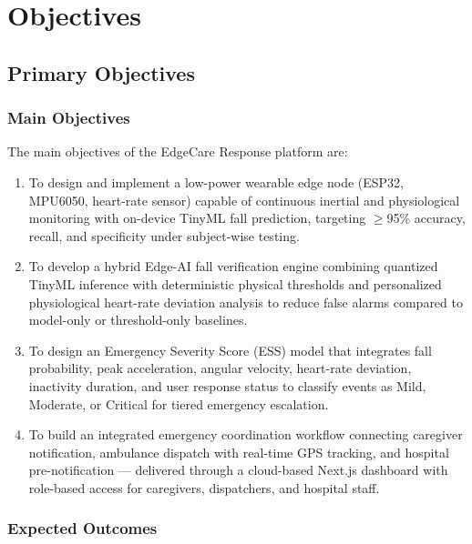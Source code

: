 \chapter{Objectives}

\section[Primary Objectives]{\textbf{Primary Objectives}}

\subsection{Main Objectives}

The main objectives of the EdgeCare Response platform are:
\begin{enumerate}
\item To design and implement a low-power wearable edge node (ESP32, MPU6050, heart-rate sensor) capable of continuous inertial and physiological monitoring with on-device TinyML fall prediction, targeting $\geq$95\% accuracy, recall, and specificity under subject-wise testing.
\item To develop a hybrid Edge-AI fall verification engine combining quantized TinyML inference with deterministic physical thresholds and personalized physiological heart-rate deviation analysis to reduce false alarms compared to model-only or threshold-only baselines.
\item To design an Emergency Severity Score (ESS) model that integrates fall probability, peak acceleration, angular velocity, heart-rate deviation, inactivity duration, and user response status to classify events as Mild, Moderate, or Critical for tiered emergency escalation.
\item To build an integrated emergency coordination workflow connecting caregiver notification, ambulance dispatch with real-time GPS tracking, and hospital pre-notification — delivered through a cloud-based Next.js dashboard with role-based access for caregivers, dispatchers, and hospital staff.
\end{enumerate}

\subsection{Expected Outcomes}


